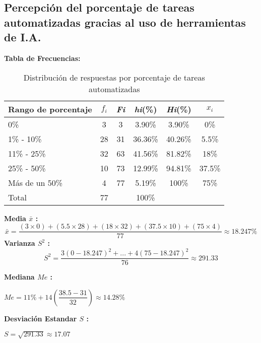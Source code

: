 \subsection{Percepción del porcentaje de tareas automatizadas gracias al uso de herramientas de I.A.}
\vspace{-0.5cm}
\textbf{Tabla de Frecuencias:}

\begin{table}[h!]
	\centering
	\renewcommand{\arraystretch}{1.2}
	\begin{tabular}{l c c c c c}
		\hline
		{Rango de porcentaje} & {\(f_i\)} & \textit{Fi} & \textit{hi}(\%) & \textit{Hi}(\%) & \(x_i\)\\
		\hline
		0\%                  & 3  & 3  & 3.90\%  & 3.90\% & 0\% \\
		1\% - 10\%           & 28 & 31 & 36.36\% & 40.26\% & 5.5\% \\
		11\% - 25\%          & 32 & 63 & 41.56\% & 81.82\% & 18\% \\
		25\% - 50\%          & 10 & 73 & 12.99\% & 94.81\% &37.5\% \\
		Más de un 50\%       & 4  & 77 & 5.19\%  & 100\% & 75\% \\
		\hline
		Total                & 77 &    & 100\%   & & \\
		\hline
	\end{tabular}
	\caption{Distribución de respuestas por porcentaje de tareas automatizadas}
	\label{tabla:porcentaje_IA}
\end{table}
\vspace{-0.5cm}
\textbf{Media $\bar{x}$ :}
\begin{equation*}
	\bar{x} = \dfrac{(3 \times 0) + (5.5 \times 28) + (18 \times 32) + (37.5 \times 10) + (75 \times 4)}{77} \approx 18.247\%
\end{equation*}
\textbf{Varianza $S^2$ :}
\begin{equation*}
	S^2 = \dfrac{3(0-18.247)^2 + ... + 4(75 - 18.247)^2}{76} \approx 291.33
\end{equation*}
\begin{multicols}{2}
	\textbf{Mediana $Me$ :}
	\vspace{-0.5cm}
	\begin{center}
		$Me = 11\% + 14(\dfrac{38.5 - 31}{32}) \approx 14.28\%$
	\end{center}
	\textbf{Desviación Estandar $S$ :}
	\vspace{-0.5cm}
	\begin{center}
		$S = \sqrt{291.33} \approx 17.07$
	\end{center}
\end{multicols}

